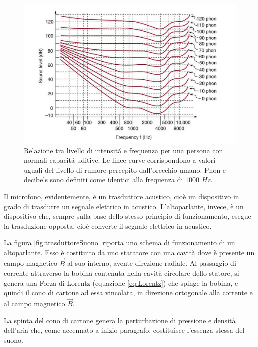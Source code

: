 \documentclass[17pt]{extarticle}
\begin{document}
\begin{figure}[b!]		
	\centering
   	\includegraphics[width=5.2in]{loudnessFrequency.png}
  	\caption{Relazione tra livello di intensit\'a e frequenza per una persona con normali capacit\'a uditive. Le linee curve corrispondono a valori uguali del livello di rumore percepito dall'orecchio umano. Phon e decibels sono definiti come identici alla frequenza di $1000$ $Hz$.}
   	\label{fig:loudnessFrequency}
\end{figure}






Il microfono, evidentemente, è un trasduttore acustico, cioè un dispositivo in grado di trasdurre un segnale elettrico in acustico. L'altoparlante, invece, è un dispositivo che, sempre sulla base dello stesso principio di funzionamento, esegue la trasduzione opposta, cioè converte il segnale elettrico in acustico.

La figura \ref{fig:trasduttoreSuono} riporta uno schema di funzionamento di un altoparlante. Esso è costituito da uno statatore con una cavità dove è presente un campo magnetico $\vec{B}$ al suo interno, avente direzione radiale. Al passaggio di corrente attraverso la bobina contenuta nella cavità circolare dello statore, si genera una Forza di Lorentz (equazione \ref{eq:Lorentz}) che spinge la bobina, e quindi il cono di cartone ad essa vincolata, in direzione ortogonale alla corrente e al campo magnetico $\vec{B}$.

La spinta del cono di cartone genera la perturbazione di pressione e densità dell'aria che, come accennato a inizio paragrafo, costituisce l'essenza stessa del suono.
\end{document}
